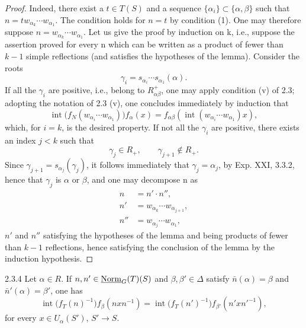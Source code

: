 \begin{proof}
Indeed, there exist a $t\in T(S)$ and a sequence $\{\alpha_i\}\subset\{\alpha,\beta\}$ such that $n=tw_{\alpha_k}\cdots w_{\alpha_1}$. The condition holds for $n=t$ by condition (1). One may therefore suppose $n=w_{\alpha_k}\cdots w_{\alpha_1}$. Let us give the proof by induction on k, i.e., suppose the assertion proved for every n which can be written as a product of fewer than $k-1$ simple reflections (and satisfies the hypotheses of the lemma). Consider the roots
\[
\gamma_i=s_{\alpha_i}\cdots s_{\alpha_1}(\alpha).
\]
If all the $\gamma_i$ are positive, i.e., belong to $R^+_{\alpha\beta}$, one may apply condition (v) of 2.3; adopting the notation of 2.3 (v), one concludes immediately by induction that
\[
\operatorname{int}\bigl(f_N(w_{\alpha_i}\cdots w_{\alpha_1})\bigr)f_\alpha(x)
=f_{\alpha\beta}(\operatorname{int}(w_{\alpha_i}\cdots w_{\alpha_1})x),
\]
which, for $i=k$, is the desired property. If not all the $\gamma_i$ are positive, there exists an index $j<k$ such that
\[
\gamma_j\in R_+,\qquad\gamma_{j+1}\notin R_+.
\]
Since $\gamma_{j+1}=s_{\alpha_j}(\gamma_j)$, it follows immediately that $\gamma_j=\alpha_j$, by Exp. XXI, 3.3.2, hence that $\gamma_j$ is $\alpha$ or $\beta$, and one may decompose n as
\[
\begin{aligned}
n&=n'\cdot n'',\\
n'&=w_{\alpha_k}\cdots w_{\alpha_{j+1}},\\
n''&=w_{\alpha_j}\cdots w_{\alpha_1},
\end{aligned}
\]
$n'$ and $n''$ satisfying the hypotheses of the lemma and being products of fewer than $k-1$ reflections, hence satisfying the conclusion of the lemma by the induction hypothesis.
\end{proof}
\begin{lemma}{2.3.4}\label{XXIII.2.3.4}
Let $\alpha\in R$. If $n,n'\in\underline{\mathrm{Norm}}_G(T)(S)$ and $\beta,\beta'\in\Delta$ satisfy $\bar n(\alpha)=\beta$ and $\bar n'(\alpha)=\beta'$, one has
\[
\operatorname{int}\bigl(f_T(n)^{-1}\bigr)f_\beta(nxn^{-1})
=\operatorname{int}\bigl(f_T(n')^{-1}\bigr)f_{\beta'}(n'xn'^{-1}),
\]
for every $x\in U_\alpha(S')$, $S'\to S$.
\end{lemma}

